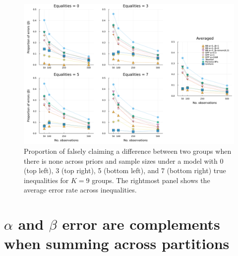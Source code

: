 \documentclass[11pt,a4paper]{article}
\theoremstyle{definition} %
\theoremstyle{case}
\begin{document}
\begin{figure}[!h]
    \centering
    \includegraphics[width=1\textwidth]{figures/subset_k_9_beta.pdf}
    \caption{Proportion of falsely claiming a difference between two groups when there is none across priors and sample sizes under a model with 0 (top left), 3 (top right), 5 (bottom left), and 7 (bottom right) true inequalities for $K = 9$ groups. The rightmost panel shows the average error rate across inequalities.}
    \label{fig:big_simulation-k9-II}
\end{figure}

\iffalse
\section{$\alpha$ and $\beta$ error are complements when summing across partitions} \label{ap:complements}
\end{document}
